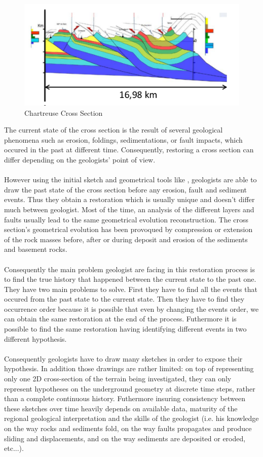 \documentclass[12pt, a4paper]{report} %
\begin{document}
\begin{figure}[H]
	\centering
	\includegraphics[scale=0.8]{Wraped_Section.png}
	\caption{Chartreuse Cross Section}
	\label{crossxeg}
\end{figure}
The current state of the cross section is the result of several geological phenomena such as erosion, foldings, sedimentations, or fault impacts, which occured in the past at different time. Consequently, restoring a cross section can differ depending on the geologists' point of view.\\\\
However using the initial sketch  and geometrical tools like \cite{Move}, geologists are able to draw the past state of the cross section before any erosion, fault and sediment events. Thus they obtain a restoration which is usually unique and doesn't differ much between geologist. 
Most of the time, an analysis of the different layers and faults usually lead to the same geometrical evolution reconstruction. The cross section's geometrical evolution has been provoqued by compression or extension of the rock masses before, after or during deposit and erosion of the sediments and basement rocks. \\\\
Consequently the main problem geologist are facing in this restoration process is to find the true history that happened between the current state to the past one. They have two main problems to solve. First they have to find all the events that occured from the past state to the current state. Then they have to find they occurrence order because it is possible that even by changing the events order, we can obtain the same restoration at the end of the process. Futhermore it is possible to find the same restoration having identifying different events in two different hypothesis. \\\\
Consequently geologists have to draw many sketches in order to expose their hypothesis. In addition those drawings are rather limited: on top of representing only one 2D cross-section of the terrain being investigated, they can only represent hypotheses on the underground geometry at discrete time steps, rather than a complete continuous history. Futhermore insuring consistency between these sketches over time heavily depends on available data, maturity of the regional geological interpretation and the skills of the geologist (i.e. his knowledge on the way rocks and sediments fold, on the way faults propagates and produce sliding and displacements, and on the way sediments are deposited or eroded, etc...).\\\\
\end{document}
